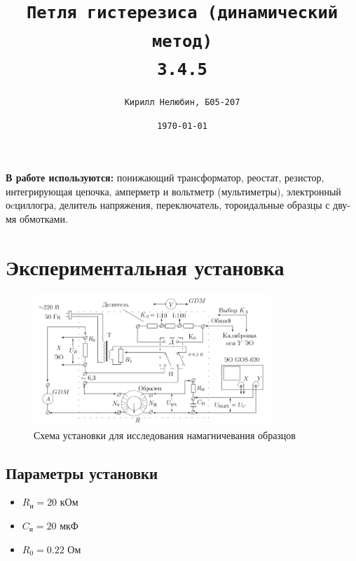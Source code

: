 \documentclass[14pt,a4paper]{article}
\title{\texttt{Петля гистерезиса (динамический метод)\\ 3.4.5}}
\author{\texttt{Кирилл Нелюбин, Б05-207}}
\date{\texttt{\today}}
\begin{document}
\maketitle


\textbf{В работе используются:}  
понижающий трансформатор, реостат, резистор, интегрирующая цепочка, амперметр и вольтметр (мультиметры), электронный оcциллогра, делитель напряжения, переключатель, тороидальные образцы с дву-
мя обмотками.


\section*{Экспериментальная установка}

\begin{figure}[H]
  \includegraphics*[width=0.8\textwidth]{2023-09-30-11-06-33.png}
  \caption{Схема установки для исследования намагничевания образцов}
  \label{fig:ust}
\end{figure}
\subsection*{Параметры установки}
\begin{itemize}
  \item $R_\text{и} = 20$ кОм
  \item $C_\text{и} = 20$ мкФ
  \item $R_0 = 0.22$ Ом
\end{itemize}
\end{document}

